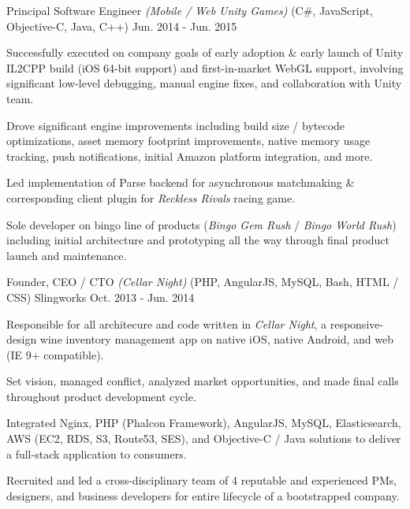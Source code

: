 \begin{cventries}

  \cventry
    {{\color{awesome}Principal Software Engineer} \textit{(Mobile / Web Unity Games)} (C\#, JavaScript, Objective-C, Java, C++)} %
    {} %
    {} %
    {Jun. 2014 - Jun. 2015} %
    { %
      \begin{cvitems}
        \item {Successfully executed on company goals of early adoption \& early launch of Unity IL2CPP build (iOS 64-bit support) and first-in-market WebGL support, involving significant low-level debugging, manual engine fixes, and collaboration with Unity team.}
        \item {Drove significant engine improvements including build size / bytecode optimizations, asset memory footprint improvements, native memory usage tracking, push notifications, initial Amazon platform integration, and more.}
        \item {Led implementation of Parse backend for asynchronous matchmaking \& corresponding client plugin for \textit{Reckless Rivals} racing game.}
        \item {Sole developer on bingo line of products (\textit{Bingo Gem Rush} / \textit{Bingo World Rush}) including initial architecture and prototyping all the way through final product launch and maintenance.}
      \end{cvitems}
    }


  \cventry
    {{\color{awesome}Founder, CEO / CTO} \textit{(Cellar Night)} (PHP, AngularJS, MySQL, Bash, HTML / CSS)} %
    {Slingworks} %
    {} %
    {Oct. 2013 - Jun. 2014} %
    { %
      \begin{cvitems}
        \item {Responsible for all architecure and code written in \textit{Cellar Night}, a responsive-design wine inventory management app on native iOS, native Android, and web (IE 9+ compatible).}
        \item {Set vision, managed conflict, analyzed market opportunities, and made final calls throughout product development cycle.}
        \item {Integrated Nginx, PHP (Phalcon Framework), AngularJS, MySQL, Elasticsearch, AWS (EC2, RDS, S3, Route53, SES), and Objective-C / Java solutions to deliver a full-stack application to consumers.}
        \item {Recruited and led a cross-disciplinary team of 4 reputable and experienced PMs, designers, and business developers for entire lifecycle of a bootstrapped company.}
      \end{cvitems}
    }


\end{cventries}
